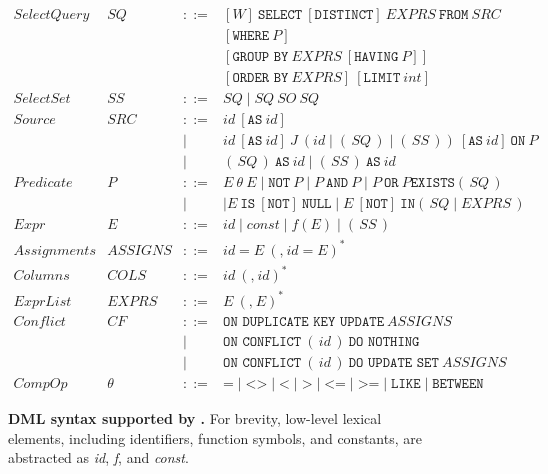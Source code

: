 \begin{figure}[t]
\[\begin{array}{rlcl}
		\textit{SelectQuery} & SQ & ::= &
		[W]~\texttt{SELECT}~[\texttt{DISTINCT}]~EXPRS~\texttt{FROM}~SRC \\
		& & & [\texttt{WHERE}~P] \\
		& & & [\texttt{GROUP BY}~EXPRS~[\texttt{HAVING}~P]] \\
		& & & [\texttt{ORDER BY}~EXPRS]~[\texttt{LIMIT}~int] \\[2pt]
		
		\textit{SelectSet} & SS & ::= &
		SQ \mid SQ~SO~SQ \\[2pt]
		
		\textit{Source} & SRC & ::= &
		id~[\texttt{AS}~id] \\
		& & \mid &
		id~[\texttt{AS}~id]~J~(id \mid (\,SQ\,) \mid (\,SS\,))~[\texttt{AS}~id]~\texttt{ON}~P \\
		& & \mid &
		(\,SQ\,)~\texttt{AS}~id
		\mid (\,SS\,)~\texttt{AS}~id \\[2pt]
		
		\textit{Predicate} & P & ::= &
		E~\theta~E
		\mid \texttt{NOT}~P
		\mid P~\texttt{AND}~P
		\mid P~\texttt{OR}~P 
		\texttt{EXISTS}(\,SQ\,) \\
		& & \mid &
		\mid E~\texttt{IS}~[\texttt{NOT}]~\texttt{NULL}
		\mid E~[\texttt{NOT}]~\texttt{IN}(\,SQ \mid EXPRS\,) \\[2pt]
		
		\textit{Expr} & E & ::= &
		id
		\mid const
		\mid f(E)
		\mid (\,SS\,) \\[2pt]
		
		\textit{Assignments} & ASSIGNS & ::= &
		id = E~(\texttt{,}~id = E)^* \\[2pt]
		
		\textit{Columns} & COLS & ::= &
		id~(\texttt{,}~id)^* \\[2pt]
		
		\textit{ExprList} & EXPRS & ::= &
		E~(\texttt{,}~E)^* \\[2pt]
		
		\textit{Conflict} & CF & ::= &
		\texttt{ON DUPLICATE KEY UPDATE}~ASSIGNS \\
		& & \mid &
		\texttt{ON CONFLICT}~(\,id\,)~\texttt{DO NOTHING} \\
		& & \mid &
		\texttt{ON CONFLICT}~(\,id\,)~\texttt{DO UPDATE SET}~ASSIGNS \\[2pt]
		
		\textit{CompOp} & \theta & ::= &
		\texttt{=} \mid \texttt{<>} \mid \texttt{<} \mid \texttt{>}
		\mid \texttt{<=} \mid \texttt{>=} \mid \texttt{LIKE} \mid \texttt{BETWEEN}
	\end{array}
	\]
	\vspace{-4mm}
	\caption{\textbf{DML syntax supported by \toolname.} For brevity, low-level lexical elements, including identifiers, function symbols, and constants, are abstracted as \textit{id}, \textit{f}, and \textit{const}.}
	\label{fig:dml-bnf-compact}
	\vspace{-2mm}
\end{figure}

